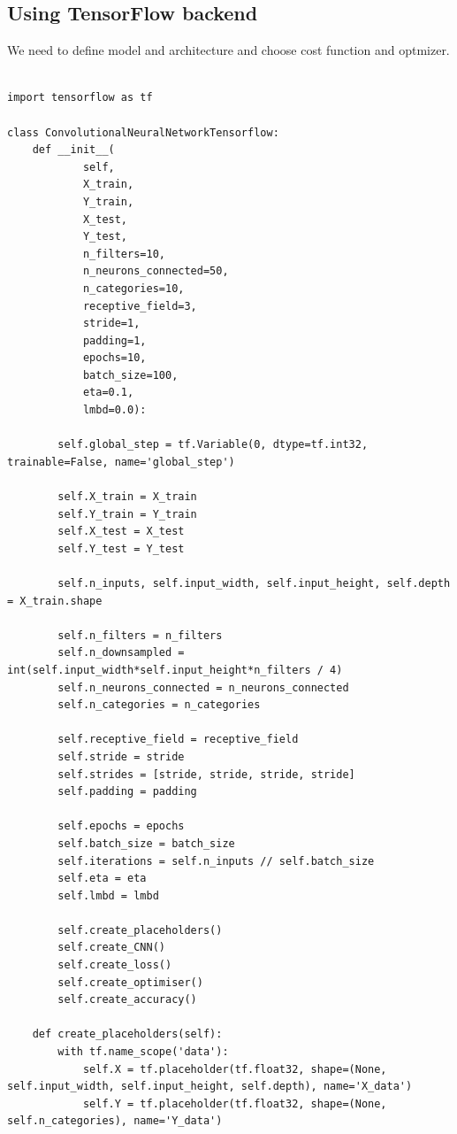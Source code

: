 \documentclass[%
oneside,                 %
final,                   %
10pt]{article}
\begin{document}
\subsection*{Using TensorFlow backend}

We need to define model and architecture and choose cost function and optmizer.
\begin{Verbatim}[numbers=none,fontsize=\fontsize{9pt}{9pt},baselinestretch=0.95]

import tensorflow as tf

class ConvolutionalNeuralNetworkTensorflow:
    def __init__(
            self,
            X_train,
            Y_train,
            X_test,
            Y_test,
            n_filters=10,
            n_neurons_connected=50,
            n_categories=10,
            receptive_field=3,
            stride=1,
            padding=1,
            epochs=10,
            batch_size=100,
            eta=0.1,
            lmbd=0.0):
        
        self.global_step = tf.Variable(0, dtype=tf.int32, trainable=False, name='global_step')
        
        self.X_train = X_train
        self.Y_train = Y_train
        self.X_test = X_test
        self.Y_test = Y_test
        
        self.n_inputs, self.input_width, self.input_height, self.depth = X_train.shape
        
        self.n_filters = n_filters
        self.n_downsampled = int(self.input_width*self.input_height*n_filters / 4)
        self.n_neurons_connected = n_neurons_connected
        self.n_categories = n_categories
        
        self.receptive_field = receptive_field
        self.stride = stride
        self.strides = [stride, stride, stride, stride]
        self.padding = padding
        
        self.epochs = epochs
        self.batch_size = batch_size
        self.iterations = self.n_inputs // self.batch_size
        self.eta = eta
        self.lmbd = lmbd
        
        self.create_placeholders()
        self.create_CNN()
        self.create_loss()
        self.create_optimiser()
        self.create_accuracy()
    
    def create_placeholders(self):
        with tf.name_scope('data'):
            self.X = tf.placeholder(tf.float32, shape=(None, self.input_width, self.input_height, self.depth), name='X_data')
            self.Y = tf.placeholder(tf.float32, shape=(None, self.n_categories), name='Y_data')
    

\end{Verbatim}
\end{document}
